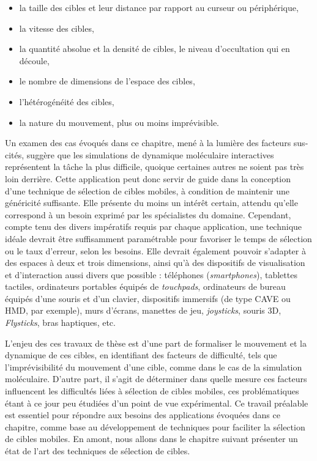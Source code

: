 	\begin{itemize}
		\item la taille des cibles et leur distance par rapport au \og curseur \fg{} ou périphérique,
		\item la vitesse des cibles,
		\item la quantité absolue et la densité de cibles, le niveau d'occultation qui en découle,
		\item le nombre de dimensions de l'espace des cibles,
		\item l'hétérogénéité des cibles,
		\item la nature du mouvement, plus ou moins imprévisible.
	\end{itemize}
	Un examen des cas évoqués dans ce chapitre, mené à la lumière des facteurs sus-cités, suggère que les simulations de dynamique moléculaire interactives représentent la tâche la plus difficile, quoique certaines autres ne soient pas très loin derrière. Cette application peut donc servir de guide dans la conception d'une technique de sélection de cibles mobiles, à condition de maintenir une généricité suffisante. Elle présente du moins un intérêt certain, attendu qu'elle correspond à un besoin exprimé par les spécialistes du domaine. Cependant, compte tenu des divers impératifs requis par chaque application, une technique idéale devrait être suffisamment paramétrable pour favoriser le temps de sélection ou le taux d'erreur, selon les besoins. Elle devrait également pouvoir s'adapter à des espaces à deux et trois dimensions, ainsi qu'à des dispositifs de visualisation et d'interaction aussi divers que possible : téléphones (\emph{smartphones}), tablettes tactiles, ordinateurs portables équipés de \emph{touchpads}, ordinateurs de bureau équipés d'une souris et d'un clavier, dispositifs immersifs (de type CAVE ou HMD, par exemple), murs d'écrans, manettes de jeu, \emph{joysticks}, souris 3D, \emph{Flysticks}\footnotemark, bras haptiques, etc.
	
	
	L'enjeu des ces travaux de thèse est d'une part de formaliser le mouvement et la dynamique de ces cibles, en identifiant des facteurs de difficulté, tels que l'imprévisibilité du mouvement d'une cible, comme dans le cas de la simulation moléculaire. D'autre part, il s'agit de déterminer dans quelle mesure ces facteurs influencent les difficultés liées à sélection de cibles mobiles, ces problématiques étant à ce jour peu étudiées d'un point de vue expérimental. Ce travail préalable est essentiel pour répondre aux besoins des applications évoquées dans ce chapitre, comme base au développement de techniques pour faciliter la sélection de cibles mobiles. 	En amont, nous allons dans le chapitre suivant présenter un état de l'art des techniques de sélection de cibles.